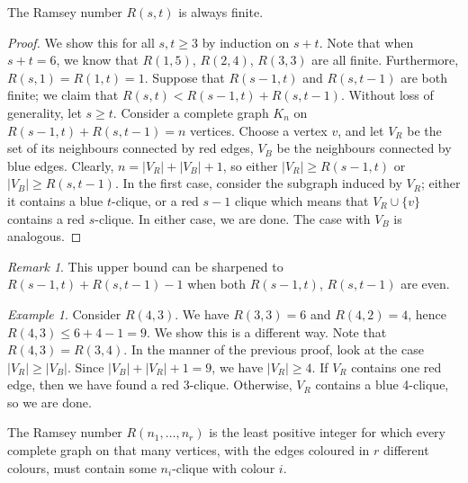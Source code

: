 \documentclass[11pt]{article}
\theoremstyle{definition}
\theoremstyle{remark}
\newtheorem*{remark}{Remark}
\newtheorem*{example}{Example}
\numberwithin{equation}{section}
\begin{document}
    \begin{theorem}
        The Ramsey number $R(s, t)$ is always finite.
    \end{theorem}
    \begin{proof}
        We show this for all $s, t \geq 3$ by induction on $s + t$. Note that when $s
        + t = 6$, we know that $R(1, 5)$, $R(2, 4)$, $R(3, 3)$ are all finite.
        Furthermore, $R(s, 1) = R(1, t) = 1$. Suppose that $R(s - 1, t)$ and $R(s, t
        - 1)$ are both finite; we claim that $R(s, t) < R(s - 1, t) + R(s, t - 1)$.
        Without loss of generality, let $s \geq t$. Consider a complete graph $K_n$
        on $R(s - 1, t) + R(s, t - 1) = n$ vertices. Choose a vertex $v$, and let
        $V_R$ be the set of its neighbours connected by red edges, $V_B$ be the
        neighbours connected by blue edges. Clearly, $n = |V_R| + |V_B| + 1$, so
        either $|V_R| \geq R(s - 1, t)$ or $|V_B| \geq R(s, t - 1)$. In the first
        case, consider the subgraph induced by $V_R$; either it contains a blue
        $t$-clique, or a red $s - 1$ clique which means that $V_R \cup \{v\}$
        contains a red $s$-clique. In either case, we are done. The case with $V_B$
        is analogous.
    \end{proof}
    \begin{remark}
        This upper bound can be sharpened to $R(s - 1, t) + R(s, t - 1) - 1$ when
        both $R(s - 1, t)$, $R(s, t - 1)$ are even.
    \end{remark}
    \begin{example}
        Consider $R(4, 3)$. We have $R(3, 3) = 6$ and $R(4, 2) = 4$, hence $R(4, 3)
        \leq 6 + 4 - 1 = 9$. We show this is a different way. Note that $R(4, 3) =
        R(3, 4)$. In the manner of the previous proof, look at the case $|V_R| \geq
        |V_B|$. Since $|V_B| + |V_R| + 1 = 9$, we have $|V_R| \geq 4$. If $V_R$
        contains one red edge, then we have found a red 3-clique. Otherwise, $V_R$
        contains a blue 4-clique, so we are done.
    \end{example}

    \begin{definition}
        The Ramsey number $R(n_1, \dots, n_r)$ is the least positive integer for
        which every complete graph on that many vertices, with the edges coloured in
        $r$ different colours, must contain some $n_i$-clique with colour $i$.
    \end{definition}
\end{document}
